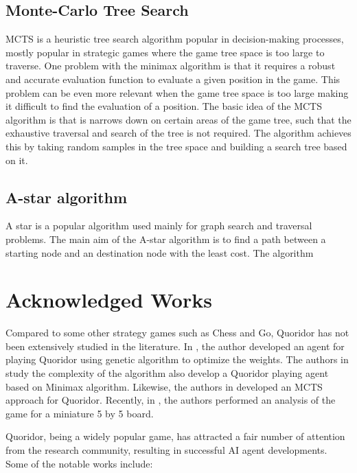\subsection{Monte-Carlo Tree Search}
\ac{MCTS} \citep{Coulom2006Efficient} is a heuristic tree search algorithm popular in decision-making processes, mostly popular in strategic games where the game tree space is too large to traverse. One problem with the minimax algorithm is that it requires a robust and accurate evaluation function to evaluate a given position in the game. This problem can be even more relevant when the game tree space is too large making it difficult to find the evaluation of a position. The basic idea of the \ac{MCTS} algorithm is that is narrows down on certain areas of the game tree, such that the exhaustive traversal and search of the tree is not required. The algorithm achieves this by taking random samples in the tree space and building a search tree based on it.

\subsection{A-star algorithm}
A star is a popular algorithm \citep{Hart1968AFormal} used mainly for graph search and traversal problems. The main aim of the A-star algorithm is to find a path between a starting node and an destination node with the least cost. The algorithm 


\section {Acknowledged Works}

Compared to some other strategy games such as Chess and Go, Quoridor has not been extensively studied in the literature. In \citep{Glendenning2002MasteringQ}, the author developed an agent for playing Quoridor using genetic algorithm to optimize the weights. The authors in \citep{Mertens2006Quoridor} study the complexity of the algorithm also develop a Quoridor playing agent based on Minimax algorithm. Likewise, the authors in \citep{Brenner2015Artificial} developed an \ac{MCTS} approach for Quoridor. Recently, in \citep{Iwanaga2022Analysis}, the authors performed an analysis of the game for a miniature 5 by 5 board.


Quoridor, being a widely popular game, has attracted a fair number of attention from the research community,
resulting in successful AI agent developments. Some of the notable works include:

